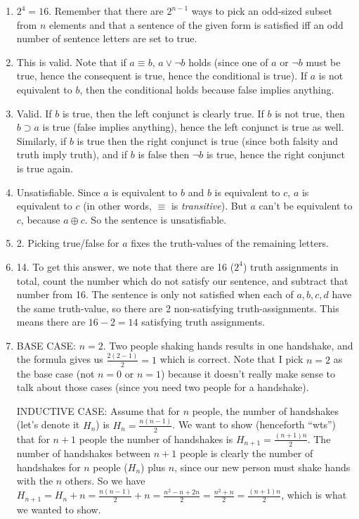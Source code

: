 \begin{mdframed}[linewidth=1]
\begin{enumerate}
    \item $2^4 = 16$. Remember that there are $2^{n-1}$ ways to pick an odd-sized subset from $n$ elements and that a sentence of the given form is satisfied iff an odd number of sentence letters are set to true. 

    \item This is valid. Note that if $a \equiv b$, $a \vee \lnot b$ holds (since one of $a$ or $\lnot b$ must be true, hence the consequent is true, hence the conditional is true). If $a$ is not equivalent to $b$, then the conditional holds because false implies anything. 

    \item Valid. If $b$ is true, then the left conjunct is clearly true. If $b$ is not true, then $b \supset a$ is true (false implies anything), hence the left conjunct is true as well. Similarly, if $b$ is true then the right conjunct is true (since both falsity and truth imply truth), and if $b$ is false then $\lnot b$ is true, hence the right conjunct is true again. 

    \item Unsatisfiable. Since $a$ is equivalent to $b$ and $b$ is equivalent to $c$, $a$ is equivalent to $c$ (in other words, $\equiv$ is \emph{transitive}). But $a$ can't be equivalent to $c$, because $a \oplus c$. So the sentence is unsatisfiable. 

    \item 2. Picking true/false for $a$ fixes the truth-values of the remaining letters. 

    \item 14. To get this answer, we note that there are 16 ($2^4$) truth assignments in total, count the number which do not satisfy our sentence, and subtract that number from 16. The sentence is only not satisfied when each of $a, b, c, d$ have the same truth-value, so there are 2 non-satisfying truth-assignments. This means there are $16 - 2 = 14$ satisfying truth assignments. 

    \item BASE CASE: $n = 2$. Two people shaking hands results in one handshake, and the formula gives us $\frac{2(2-1)}{2} = 1$ which is correct. Note that I pick $n = 2$ as the base case (not $n = 0$ or $n = 1$) because it doesn't really make sense to talk about those cases (since you need two people for a handshake). 

    INDUCTIVE CASE: Assume that for $n$ people, the number of handshakes (let's denote it $H_n$) is $H_n = \frac{n(n-1)}{2}$. We want to show (henceforth ``wts'') that for $n + 1$ people the number of handshakes is $H_{n+1} = \frac{(n+1)n}{2}$. The number of handshakes between $n + 1$ people is clearly the number of handshakes for $n$ people ($H_n$) plus $n$, since our new person must shake hands with the $n$ others. So we have $H_{n+1} = H_n + n = \frac{n(n-1)}{2} + n = \frac{n^2 - n + 2n}{2} = \frac{n^2 + n}{2} = \frac{(n+1)n}{2}$, which is what we wanted to show. 

\end{enumerate}
\end{mdframed}